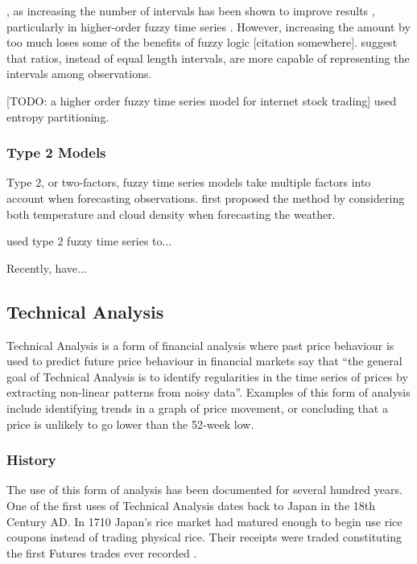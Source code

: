 \documentclass{article}
\theoremstyle{definition}
\begin{document}
, as increasing the number of intervals has been shown to improve results \citep{chen2004new}, particularly in higher-order fuzzy time series \citep{chen2002forecasting}. However, increasing the amount by too much loses some of the benefits of fuzzy logic [citation somewhere]. \cite{huarng2006ratio} suggest that ratios, instead of equal length intervals, are more capable of representing the intervals among observations.

[TODO: a higher order fuzzy time series model for internet stock trading] used entropy partitioning.

\subsubsection{Type 2 Models}

Type 2, or two-factors, fuzzy time series models take multiple factors into account when forecasting observations. \cite{temperatureprediction2000} first proposed the method by considering both temperature and cloud density when forecasting the weather. 

\cite{huarng2005type} used type 2 fuzzy time series to...

Recently, \cite{chu2009fuzzy} have...

\subsection{Technical Analysis}

Technical Analysis is a form of financial analysis where past price behaviour is used to predict future price behaviour in financial markets \cite{foundations} say that ``the general goal of Technical Analysis is to identify regularities in the time series of prices by extracting non-linear patterns from noisy data''. Examples of this form of analysis include identifying trends in a graph of price movement, or concluding that a price is unlikely to go lower than the 52-week low.

\subsubsection{History}

The use of this form of analysis has been documented for several hundred years. One of the first uses of Technical Analysis dates back to Japan in the 18th Century AD. In 1710 Japan's rice market had matured enough to begin use rice coupons instead of trading physical rice. Their receipts were traded constituting the first Futures trades ever recorded \citep[p.15]{jcct1991}. 
\end{document}
